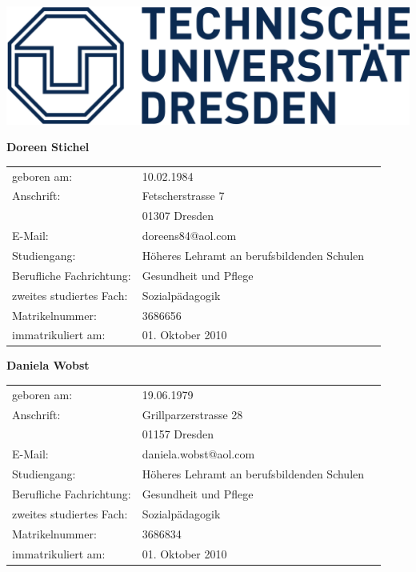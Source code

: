 \begin{flushright}
	\includegraphics[scale=0.5]{images/TU-Logo.png}
\end{flushright}

\noindent
\textbf{Doreen Stichel}\\[0,5cm]
\begin{tabular}{lll}
geboren am: & 10.02.1984\\[0,5cm]
Anschrift: & Fetscherstrasse 7\\
& 01307 Dresden\\[0,5cm]
E-Mail: & \flq{}doreens84@aol.com\frq{}\\[0,5cm]
Studiengang: & Höheres Lehramt an berufsbildenden Schulen\\
Berufliche Fachrichtung: & Gesundheit und Pflege\\
zweites studiertes Fach: & Sozialpädagogik\\[0,5cm]
Matrikelnummer: & 3686656\\[0,5cm]
immatrikuliert am: & 01. Oktober 2010\\[2cm]
\end{tabular}

\noindent
\textbf{Daniela Wobst}\\[0,5cm]
\begin{tabular}{lll}
geboren am: & 19.06.1979\\[0,5cm]
Anschrift: & Grillparzerstrasse 28\\
& 01157 Dresden\\[0,5cm]
E-Mail: & \flq{}daniela.wobst@aol.com\frq{}\\[0,5cm]
Studiengang: & Höheres Lehramt an berufsbildenden Schulen\\
Berufliche Fachrichtung: & Gesundheit und Pflege\\
zweites studiertes Fach: & Sozialpädagogik\\[0,5cm]
Matrikelnummer: & 3686834\\[0,5cm]
immatrikuliert am: & 01. Oktober 2010
\end{tabular}